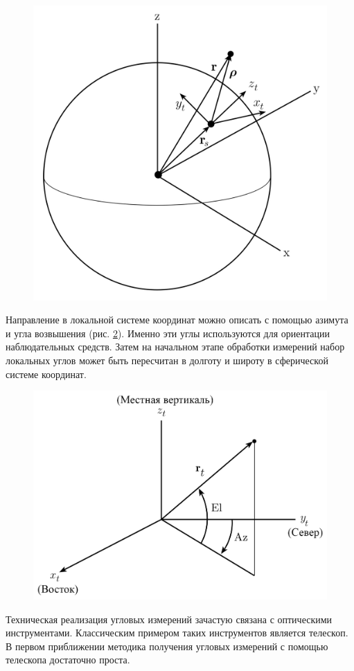 \begin{figure}[h!]
    \centering
    \includegraphics[width=0.5\linewidth]{../images/review/topo.PNG}
    \label{fig:topo}
\end{figure}

Направление в локальной системе координат можно описать с помощью
азимута и угла возвышения (рис. \ref{fig:enu}).
Именно эти углы используются для ориентации наблюдательных средств.
Затем на начальном этапе обработки измерений набор локальных углов
может быть пересчитан в долготу и широту в сферической системе координат.

\begin{figure}[h!]
    \centering
    \includegraphics[width=0.5\linewidth]{../images/review/enu.PNG}
    \label{fig:enu}
\end{figure}

Техническая реализация угловых измерений зачастую связана с оптическими инструментами. 
Классическим примером таких инструментов является телескоп. 
В первом приближении методика получения угловых измерений с помощью телескопа достаточно проста.

